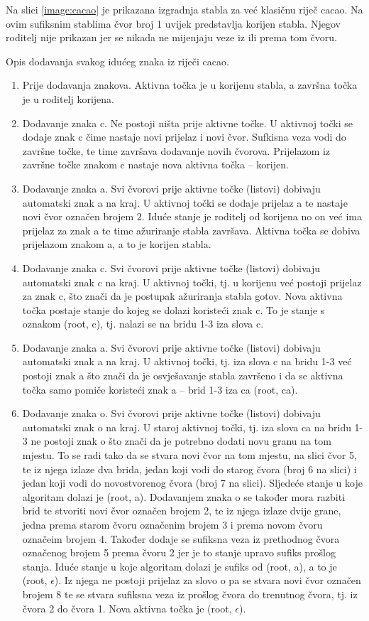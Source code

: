 \documentclass[times, utf8, seminar, numeric]{fer}
\begin{document}
Na slici \ref{image:cacao} je prikazana izgradnja stabla za već klasičnu riječ cacao. Na ovim sufiksnim stablima čvor broj 1 uvijek predstavlja korijen stabla. Njegov roditelj nije prikazan jer se nikada ne mijenjaju veze iz ili prema tom čvoru.

Opis dodavanja svakog idućeg znaka iz riječi cacao.
\begin{enumerate}
	\item Prije dodavanja znakova. Aktivna točka je u korijenu stabla, a završna točka je u roditelj korijena.
	\item Dodavanje znaka c. Ne postoji ništa prije aktivne točke. U aktivnoj točki se dodaje znak c čime nastaje novi prijelaz i novi čvor. Sufkisna veza vodi do završne točke, te time završava dodavanje novih čvorova. Prijelazom iz završne točke znakom c nastaje nova aktivna točka -- korijen.
	\item Dodavanje znaka a. Svi čvorovi prije aktivne točke (listovi) dobivaju automatski znak a na kraj. U aktivnoj točki se dodaje prijelaz a te nastaje novi čvor označen brojem 2. Iduće stanje je roditelj od korijena no on već ima prijelaz za znak a te time ažuriranje stabla završava. Aktivna točka se dobiva prijelazom znakom a, a to je korijen stabla.
	\item Dodavanje znaka c. Svi čvorovi prije aktivne točke (listovi) dobivaju automatski znak c na kraj. U aktivnoj točki, tj. u korijenu već postoji prijelaz za znak c, što znači da je postupak ažuriranja stabla gotov. Nova aktivna točka postaje stanje do kojeg se dolazi koristeći znak c. To je stanje s oznakom (root, c), tj. nalazi se na bridu 1-3 iza slova c.
	\item Dodavanje znaka a. Svi čvorovi prije aktivne točke (listovi) dobivaju automatski znak a na kraj. U aktivnoj točki, tj. iza slova c na bridu 1-3 već postoji znak a što znači da je osvješavanje stabla završeno i da se aktivna točka samo pomiče koristeći znak a -- brid 1-3 iza ca (root, ca).
	\item Dodavanje znaka o. Svi čvorovi prije aktivne točke (listovi) dobivaju automatski znak o na kraj. U staroj aktivnoj točki, tj. iza slova ca na bridu 1-3 ne postoji znak o što znači da je potrebno dodati novu granu na tom mjestu. To se radi tako da se stvara novi čvor na tom mjestu, na slici čvor 5, te iz njega izlaze dva brida, jedan koji vodi do starog čvora (broj 6 na slici) i jedan koji vodi do novostvorenog čvora (broj 7 na slici). Sljedeće stanje u koje algoritam dolazi je (root, a). Dodavanjem znaka o se također mora razbiti brid te stvoriti novi čvor označen brojem 2, te iz njega izlaze dvije grane, jedna prema starom čvoru označenim brojem 3 i prema novom čvoru označeim brojem 4. Također dodaje se sufiksna veza iz prethodnog čvora označenog brojem 5 prema čvoru 2 jer je to stanje upravo sufiks prošlog stanja. Iduće stanje u koje algoritam dolazi je sufiks od (root, a), a to je (root, $\epsilon$). Iz njega ne postoji prijelaz za slovo o pa se stvara novi čvor označen brojem 8 te se stvara sufiksna veza iz prošlog čvora do trenutnog čvora, tj. iz čvora 2 do čvora 1. Nova aktivna točka je (root, $\epsilon$).
\end{enumerate}
\end{document}
